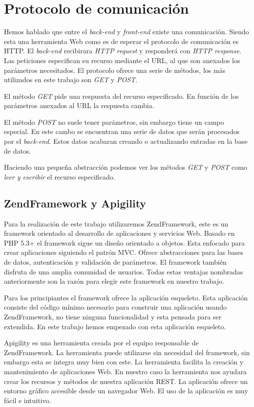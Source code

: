 \section{Protocolo de comunicación}
  	Hemos hablado que entre el \emph{back-end} y \emph{front-end} existe una comunicación. Siendo esta una herramienta Web como es de esperar el
	protocolo de comunicación es HTTP\cite{HTTP}. El \emph{back-end} recibirara \emph{HTTP request} y responderá con \emph{HTTP response}. Las
	peticiones especifican su recurso mediante el URL, al que son anexados los parámetros necesitados. El protocolo ofrece una serie de
	métodos, los más utilizados en este trabajo son \emph{GET} y \emph{POST}. 
	\par
	El método \emph{GET} pide una respuesta del recurso especificado. En función de los parámetros anexados al URL la respuesta cambia.
	\par
	El método \emph{POST} no suele tener parámetros, sin embargo tiene un campo especial. En este cambo se encuentran una serie de datos que serán
	procesados por el \emph{back-end}. Estos datos acabaran creando o actualizando entradas en la base de datos. 
	\par
	Haciendo una pequeña abstracción podemos ver los métodos \emph{GET} y \emph{POST} como \emph{leer y escribir} el recurso especificado.
\subsection{ZendFramework y Apigility}
	Para la realización de este trabajo utilizaremos ZendFramework, este es un framework orientado al desarrollo de aplicaciones y servicios Web.
	Basado en PHP 5.3+ el framework sigue un diseño orientado a objetos. Esta enfocado para crear aplicaciones siguiendo el patrón MVC. Ofrece
	abstracciones para las bases de datos, autenticación y validación de parámetros. El framework también disfruta de una amplia comunidad de 
	usuarios. Todas estas ventajas nombradas anteriormente son la razón para elegir este framework en nuestro trabajo.
	\par
 	Para  los principiantes el framework ofrece la aplicación esqueleto. Esta aplicación consiste del código mínimo necesario para construir una
	aplicación usando ZendFramework, no tiene ninguna funcionalidad y esta pensada para ser extendida. En este trabajo hemos empezado con esta
	aplicación esqueleto.
  	\par 
  	Apigility es una herramienta creada por el equipo responsable de ZendFramework. La herramienta puede utilizarse sin necesidad del framework,
	sin embargo esta se integra muy bien con este. La herramienta facilita la creación y mantenimiento de aplicaciones Web. En nuestro caso la
	herramienta nos ayudara crear los recursos y métodos de nuestra aplicación REST. La aplicación ofrece un entorno gráfico accesible desde un
	navegador Web. El uso de la aplicación es muy fácil e intuitivo.
